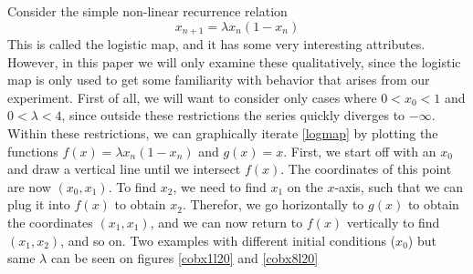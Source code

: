 \documentclass[12pt,oneside,a4paper]{article}
\numberwithin{equation}{section}
\begin{document}
{{{{Consider the simple non-linear recurrence relation
\begin{equation}
x_{n+1}=\lambda x_n (1-x_n)
\label{logmap}
\end{equation}
This is called the logistic map, and it has some very interesting attributes. However, in this paper we will only examine these qualitatively, since the logistic map is only used to get some familiarity with behavior that arises from our experiment. First of all, we will want to consider only cases where $0<x_0<1$ and $0<\lambda<4$, since outside these restrictions the series quickly diverges to $-\infty$. Within these restrictions, we can graphically iterate \eqref{logmap} by 
plotting the functions $f(x)=\lambda x_n (1-x_n)$ and $g(x)=x$. First, we start 
off with an $x_0$ and draw a vertical line until we intersect $f(x)$. The 
coordinates of this point are now $(x_0,x_1)$. To find $x_2$, we need to find
$x_1$ on the $x$-axis, such that we can plug it into $f(x)$ to obtain $x_2$. 
Therefor, we go horizontally to $g(x)$ to obtain the coordinates $(x_1,x_1)$, and 
we can now return to $f(x)$ vertically to find $(x_1,x_2)$, and so on. Two examples with different initial conditions ($x_0$) but same $\lambda$ can be seen on figures \ref{cobx1l20} and \ref{cobx8l20}

}}}}
\end{document}
